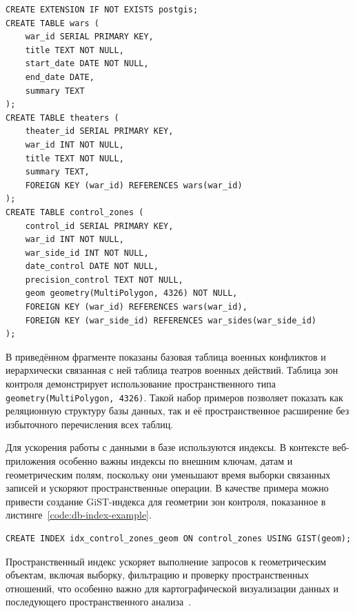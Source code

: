 \begin{code}
\label{code:db-key-tables}
\vspace{-0.75cm}
\begin{verbatim}
CREATE EXTENSION IF NOT EXISTS postgis;
CREATE TABLE wars (
    war_id SERIAL PRIMARY KEY,
    title TEXT NOT NULL,
    start_date DATE NOT NULL,
    end_date DATE,
    summary TEXT
);
CREATE TABLE theaters (
    theater_id SERIAL PRIMARY KEY,
    war_id INT NOT NULL,
    title TEXT NOT NULL,
    summary TEXT,
    FOREIGN KEY (war_id) REFERENCES wars(war_id)
);
CREATE TABLE control_zones (
    control_id SERIAL PRIMARY KEY,
    war_id INT NOT NULL,
    war_side_id INT NOT NULL,
    date_control DATE NOT NULL,
    precision_control TEXT NOT NULL,
    geom geometry(MultiPolygon, 4326) NOT NULL,
    FOREIGN KEY (war_id) REFERENCES wars(war_id),
    FOREIGN KEY (war_side_id) REFERENCES war_sides(war_side_id)
);
\end{verbatim}
\end{code}

В приведённом фрагменте показаны базовая таблица военных конфликтов и иерархически связанная с ней таблица театров военных действий. 
Таблица зон контроля демонстрирует использование пространственного типа \texttt{geometry(MultiPolygon, 4326)}. Такой набор примеров позволяет показать как реляционную структуру базы данных, так и её пространственное расширение без избыточного перечисления всех таблиц.

Для ускорения работы с данными в базе используются индексы. В контексте веб-приложения особенно важны индексы по внешним ключам, датам и геометрическим полям, поскольку они уменьшают время выборки связанных записей и ускоряют пространственные операции. В качестве примера можно привести создание GiST-индекса для геометрии зон контроля, показанное в листинге~\ref{code:db-index-example}.

\begin{code}
\label{code:db-index-example}
\vspace{-0.75cm}
\begin{verbatim}
CREATE INDEX idx_control_zones_geom ON control_zones USING GIST(geom);
\end{verbatim}
\end{code}

Пространственный индекс ускоряет выполнение запросов к геометрическим объектам, включая выборку, фильтрацию и проверку пространственных отношений, что особенно важно для картографической визуализации данных и последующего пространственного анализа~\cite{postgis_manual}.

